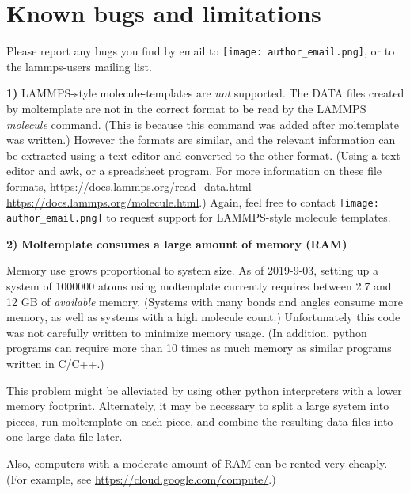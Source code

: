 \documentclass[11pt]{article}
\begin{document}
\section{Known bugs and limitations}
\label{sec:limitations}

Please report any bugs you find by email to 
\texttt{[image: author\_email.png]},
or to the lammps-users mailing list.

\textbf{1)} LAMMPS-style molecule-templates are \textit{not} supported.
The DATA files created by moltemplate are not 
in the correct format to be read by the LAMMPS \textit{molecule} command.
(This is because this command was added after moltemplate was written.)
However the formats are similar, and the relevant information can be extracted
using a text-editor and converted to the other format.
(Using a text-editor and awk, or a spreadsheet program.
For more information on these file formats, 
\url{https://docs.lammps.org/read_data.html}
\url{https://docs.lammps.org/molecule.html}.)
Again, feel free to contact \texttt{[image: author\_email.png]}
to request support for LAMMPS-style molecule templates.


\textbf{2)} \textbf{Moltemplate consumes a large amount of memory (RAM)}

Memory use grows proportional to system size.
As of 2019-9-03, setting up a system of 1000000 atoms using moltemplate 
currently requires between 2.7 and 12 GB of \textit{available} memory. 
(Systems with many bonds and angles consume more memory, 
 as well as systems with a high molecule count.)
Unfortunately this code was not carefully written to minimize memory usage. 
(In addition, python programs can require more than 10 
times as much memory as similar programs written in C/C++.)

This problem might be alleviated by using other 
python interpreters with a lower memory footprint.
Alternately, it may be necessary to split a large system into pieces, 
run moltemplate on each piece, and combine the resulting data files 
into one large data file later.

Also, computers with a moderate amount of RAM can be rented very cheaply.
(For example, see \url{https://cloud.google.com/compute/}.)
\end{document}

